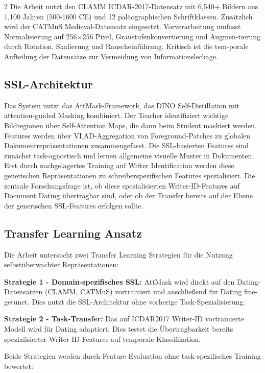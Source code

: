 \documentclass[12pt,a4paper]{article}
\begin{document}
\begin{multicols}{2}
Die Arbeit nutzt den CLAMM ICDAR-2017-Datensatz \cite{clamm2017} mit 6,540+ Bildern aus 1,100 Jahren (500-1600 CE) und 12 paläographischen Schriftklassen. Zusätzlich wird der CATMuS Medieval-Datensatz eingesetzt. Vorverarbeitung umfasst Normalisierung auf 256$\times$256 Pixel, Graustufenkonvertierung und Augmen-tierung durch Rotation, Skalierung und Rauscheinführung. Kritisch ist die tem-porale Aufteilung der Datensätze zur Vermeidung von Informationsleckage. 

\subsection{SSL-Architektur}

Das System nutzt das AttMask-Framework, das DINO Self-Distillation mit attention-guided Masking kombiniert. Der Teacher identifiziert wichtige Bildregionen über Self-Attention Maps, die dann beim Student maskiert werden. Features werden über VLAD-Aggregation von Foreground-Patches zu globalen Dokumentrepräsentationen zusammengefasst. Die SSL-basierten Features sind zunächst task-agnostisch und lernen allgemeine visuelle Muster in Dokumenten. Erst durch nachgelagertes Training auf Writer Identification werden diese generischen Repräsentationen zu schreiberspezifischen Features spezialisiert. Die zentrale Forschungsfrage ist, ob diese spezialisierten Writer-ID-Features auf Document Dating übertragbar sind, oder ob der Transfer bereits auf der Ebene der generischen SSL-Features erfolgen sollte.

\subsection{Transfer Learning Ansatz}

Die Arbeit untersucht zwei Transfer Learning Strategien für die Nutzung selbstüberwachter Repräsentationen:

\textbf{Strategie 1 - Domain-spezifisches SSL:} AttMask wird direkt auf den Dating-Datensätzen (CLAMM, CATMuS) vortrainiert und anschließend für Dating fine-getunet. Dies nutzt die SSL-Architektur ohne vorherige Task-Spezialisierung.

\textbf{Strategie 2 - Task-Transfer:} Das auf ICDAR2017 Writer-ID vortrainierte Modell wird für Dating adaptiert. Dies testet die Übertragbarkeit bereits spezialisierter Writer-ID-Features auf temporale Klassifikation.

Beide Strategien werden durch Feature Evaluation ohne task-spezifisches Training bewertet:


\end{multicols}
\end{document}
